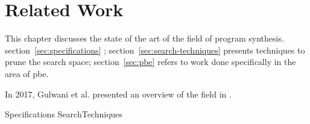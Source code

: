 \chapter{Related Work}
\label{chapter:relatedWork}



This chapter discusses the state of the art of the field of program synthesis.
section~\ref{sec:specifications} ;
section~\ref{sec:search-techniques} presents techniques to prune the search
space;
section~\ref{sec:pbe} refers to work done specifically in the area of \gls{pbe}.

In 2017, Gulwani et al. presented an overview of the field in
\cite{Gulwani2017}.

{Specifications}
{SearchTechniques}


